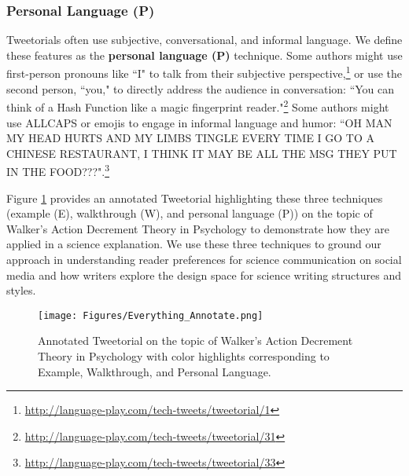 \subsubsection{Personal Language (P)}
Tweetorials often use subjective, conversational, and informal language. We define these features as the \textbf{personal language (P)} technique.  Some authors might use first-person pronouns like ``I" to talk from their subjective perspective,\footnote{\href{http://language-play.com/tech-tweets/tweetorial/1}{http://language-play.com/tech-tweets/tweetorial/1}} or use the second person, ``you," to directly address the audience in conversation: ``You can think of a Hash Function like a magic fingerprint reader."\footnote{\href{http://language-play.com/tech-tweets/tweetorial/31}{http://language-play.com/tech-tweets/tweetorial/31}} Some authors might use ALLCAPS or emojis to engage in informal language and humor: ``OH MAN MY HEAD HURTS AND MY LIMBS TINGLE EVERY TIME I GO TO A CHINESE RESTAURANT, I THINK IT MAY BE ALL THE MSG THEY PUT IN THE FOOD???".\footnote{\href{http://language-play.com/tech-tweets/tweetorial/33}{http://language-play.com/tech-tweets/tweetorial/33}} 

\vspace{5mm}
Figure \ref{fig:everything} provides an annotated Tweetorial highlighting these three techniques (example (E), walkthrough (W), and personal language (P)) on the topic of Walker's Action Decrement Theory in Psychology to demonstrate how they are applied in a science explanation. We use these three techniques to ground our approach in understanding reader preferences for science communication on social media and how writers explore the design space for science writing structures and styles. 


\begin{figure}
    \centering\texttt{[image: Figures/Everything\_Annotate.png]}
    \caption{Annotated Tweetorial on the topic of Walker's Action Decrement Theory in Psychology with color highlights corresponding to Example, Walkthrough, and Personal Language.}
    \label{fig:everything}

\end{figure}